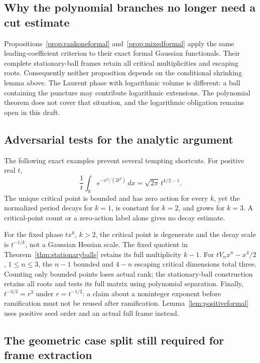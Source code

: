 \subsection{Why the polynomial branches no longer need a cut estimate}

Propositions~\ref{prop:rankoneformal} and~\ref{prop:mixedformal}
apply the same leading-coefficient criterion to their exact formal
Gaussian functionals. Their complete stationary-ball frames retain
all critical multiplicities and escaping roots. Consequently neither
proposition depends on the conditional shrinking lemma above.
The Laurent phase with logarithmic volume is different: a ball
containing the puncture may contribute logarithmic extensions.
The polynomial theorem does not cover that situation, and the
logarithmic obligation remains open in this draft.

\subsection{Adversarial tests for the analytic argument}

The following exact examples prevent several tempting shortcuts.
For positive real $t$,
\[
 \frac1t\int_{\mathbb R}e^{-x^2/(2t^k)}\,dx
   =\sqrt{2\pi}\,t^{k/2-1}.
\]
The unique critical point is bounded and has zero action for every
$k$, yet the normalized period decays for $k=1$, is constant for
$k=2$, and grows for $k=3$. A critical-point count or a zero-action
label alone gives no decay estimate.

For the fixed phase $tx^k$, $k>2$, the critical point is degenerate
and the decay scale is $t^{-1/k}$, not a Gaussian Hessian scale.
The fixed quotient in Theorem~\ref{thm:stationaryballs}
retains its full multiplicity $k-1$.
For $tV_nx^n-x^4/2$, $1\leq n\leq3$, the $n-1$ bounded and
$4-n$ escaping critical dimensions total three. Counting only
bounded points loses actual rank; the stationary-ball construction
retains all roots and tests its full matrix using polynomial separation.
Finally, $t^{-3/2}=r^3$ under $r=t^{-1/2}$: a claim about a
noninteger exponent before ramification must not be reused after
ramification. Lemma~\ref{lem:positiveformal} uses positive seed order
and an actual full frame instead.

\subsection{The geometric case split still required for frame extraction}

